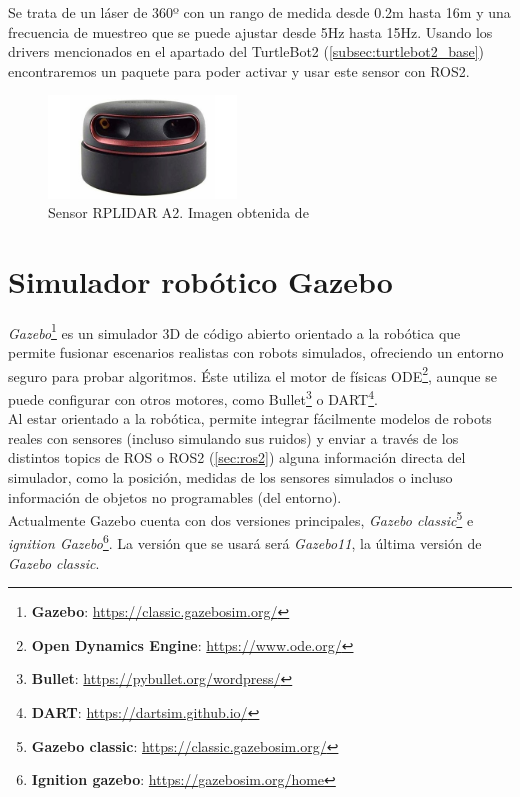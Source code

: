 Se trata de un láser de 360º con un rango de medida desde 0.2m hasta 16m y una frecuencia de muestreo que se puede ajustar desde 5Hz hasta 15Hz.
Usando los drivers mencionados en el apartado del TurtleBot2 (\ref{subsec:turtlebot2_base}) encontraremos un paquete para poder activar y usar este sensor con ROS2.\\

\begin{figure} [H]
    \begin{center}
        \includegraphics[width=5cm]{figs/c3/rplidar-a2.jpg}
    \end{center}
    \caption[RPLIDAR A2]{Sensor RPLIDAR A2. Imagen obtenida de \cite{rplidar}}
    \label{fig:rplidar}
\end{figure}

\section{Simulador robótico Gazebo}
\label{sec:gazebo}

\textit{Gazebo}\footnote{\textbf{Gazebo}: \url{https://classic.gazebosim.org/}} es un simulador 3D de código abierto orientado a la robótica que permite
fusionar escenarios realistas con robots simulados, ofreciendo un entorno seguro para probar algoritmos. Éste utiliza el motor de físicas
ODE\footnote{\textbf{Open Dynamics Engine}: \url{https://www.ode.org/}}, aunque se puede configurar con otros motores, como
Bullet\footnote{\textbf{Bullet}: \url{https://pybullet.org/wordpress/}} o DART\footnote{\textbf{DART}: \url{https://dartsim.github.io/}}.\\

Al estar orientado a la robótica, permite integrar fácilmente modelos de robots reales con sensores (incluso simulando sus ruidos) y enviar a través
de los distintos topics de ROS o ROS2 (\ref{sec:ros2}) alguna información directa del simulador, como la posición, medidas de los sensores simulados o
incluso información de objetos no programables (del entorno).\\

Actualmente Gazebo cuenta con dos versiones principales, \textit{Gazebo classic}\footnote{\textbf{Gazebo classic}: \url{https://classic.gazebosim.org/}} e
\textit{ignition Gazebo}\footnote{\textbf{Ignition gazebo}: \url{https://gazebosim.org/home}}. La versión que se usará será \textit{Gazebo11}, la última
versión de \textit{Gazebo classic}.

